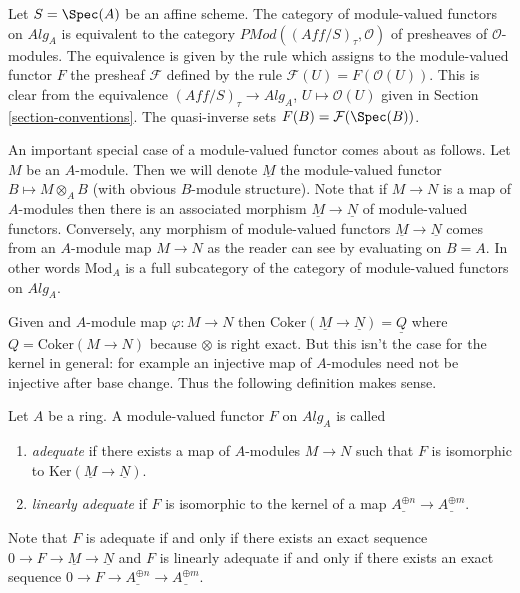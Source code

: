 \noindent
Let $S = \Spec(A)$ be an affine scheme.
The category of module-valued functors on $\textit{Alg}_A$ is
equivalent to the category
$\textit{PMod}((\textit{Aff}/S)_\tau, \mathcal{O})$
of presheaves of $\mathcal{O}$-modules. The equivalence is given
by the rule which assigns to the module-valued functor $F$ the
presheaf $\mathcal{F}$ defined by the rule
$\mathcal{F}(U) = F(\mathcal{O}(U))$.
This is clear from the equivalence
$(\textit{Aff}/S)_\tau \to \textit{Alg}_A$, $U \mapsto \mathcal{O}(U)$
given in Section \ref{section-conventions}.
The quasi-inverse sets $F(B) = \mathcal{F}(\Spec(B))$.

\medskip\noindent
An important special case of a module-valued functor comes about as follows.
Let $M$ be an $A$-module. Then we will denote $\underline{M}$ the
module-valued functor $B \mapsto M \otimes_A B$ (with obvious $B$-module
structure). Note that if $M \to N$ is a map of $A$-modules then there is an
associated morphism $\underline{M} \to \underline{N}$ of module-valued
functors. Conversely, any morphism of module-valued functors
$\underline{M} \to \underline{N}$ comes from an $A$-module map $M \to N$
as the reader can see by evaluating on $B = A$. In other words
$\text{Mod}_A$ is a full
subcategory of the category of module-valued functors on $\textit{Alg}_A$.

\medskip\noindent
Given and $A$-module map $\varphi : M \to N$ then
$\text{Coker}(\underline{M} \to \underline{N}) =
\underline{Q}$ where $Q = \text{Coker}(M \to N)$ because $\otimes$
is right exact. But this isn't the case
for the kernel in general: for example an injective map of
$A$-modules need not be injective after base change. Thus the following
definition makes sense.

\begin{definition}
\label{definition-adequate-functor}
Let $A$ be a ring. A module-valued functor $F$ on $\textit{Alg}_A$ is
called
\begin{enumerate}
\item {\it adequate} if there exists a
map of $A$-modules $M \to N$ such that $F$ is isomorphic to
$\text{Ker}(\underline{M} \to \underline{N})$.
\item {\it linearly adequate} if $F$ is isomorphic to the
kernel of a map $\underline{A^{\oplus n}} \to \underline{A^{\oplus m}}$.
\end{enumerate}
\end{definition}

\noindent
Note that $F$ is adequate if and only if there exists an
exact sequence $0 \to F \to \underline{M} \to \underline{N}$ and
$F$ is linearly adequate if and only if there exists an exact sequence
$0 \to F \to \underline{A^{\oplus n}} \to \underline{A^{\oplus m}}$.

